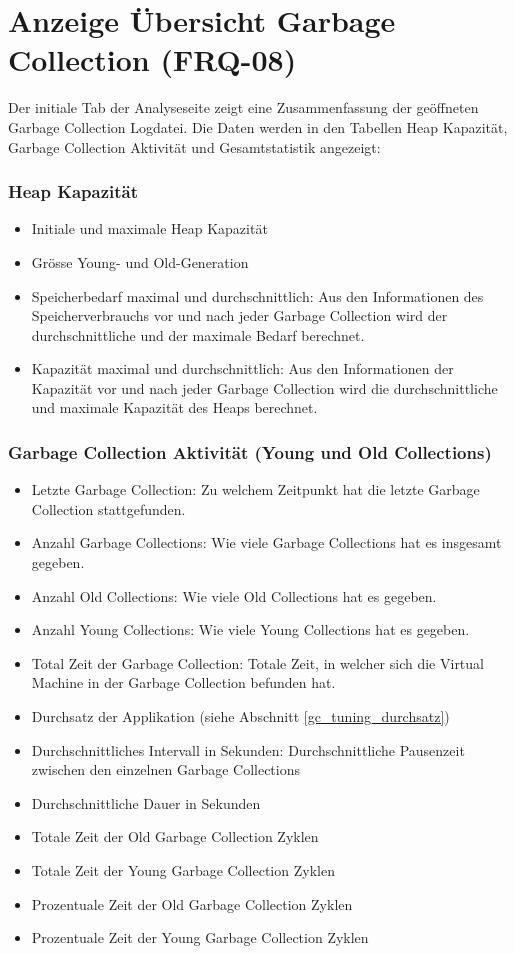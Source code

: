\section{Anzeige Übersicht Garbage Collection (FRQ-08)}\label{standardreport}
Der initiale Tab der Analyseseite zeigt eine Zusammenfassung der geöffneten Garbage Collection Logdatei. Die Daten werden in den Tabellen Heap Kapazität, Garbage Collection Aktivität und Gesamtstatistik angezeigt:

\subsubsection{Heap Kapazität}
\begin{itemize}
	\item Initiale und maximale Heap Kapazität
	\item Grösse Young- und Old-Generation
	\item Speicherbedarf maximal und durchschnittlich: Aus den Informationen des Speicherverbrauchs vor und nach jeder Garbage Collection wird der durchschnittliche und der maximale Bedarf berechnet.
	\item Kapazität maximal und durchschnittlich: Aus den Informationen der Kapazität vor und nach jeder Garbage Collection wird die durchschnittliche und maximale Kapazität des Heaps berechnet.

\end{itemize}
\subsubsection{Garbage Collection Aktivität (Young und Old Collections)}
\begin{itemize}
	\item Letzte Garbage Collection: Zu welchem Zeitpunkt hat die letzte Garbage Collection stattgefunden.
	\item Anzahl Garbage Collections: Wie viele Garbage Collections hat es insgesamt gegeben.
	\item  Anzahl Old Collections: Wie viele Old Collections hat es gegeben.
	\item Anzahl Young Collections: Wie viele Young Collections hat es gegeben.
	\item Total Zeit der Garbage Collection: Totale Zeit, in welcher sich die Virtual Machine in der Garbage Collection befunden hat.
	\item Durchsatz der Applikation (siehe Abschnitt \ref{gc_tuning_durchsatz})

	\item Durchschnittliches Intervall in Sekunden: Durchschnittliche Pausenzeit zwischen den einzelnen Garbage Collections
	\item Durchschnittliche Dauer in Sekunden
	\item Totale Zeit der Old Garbage Collection Zyklen
	\item Totale Zeit der Young Garbage Collection Zyklen
	\item Prozentuale Zeit der Old Garbage Collection Zyklen
	\item Prozentuale Zeit der Young Garbage Collection Zyklen
\end{itemize}	

